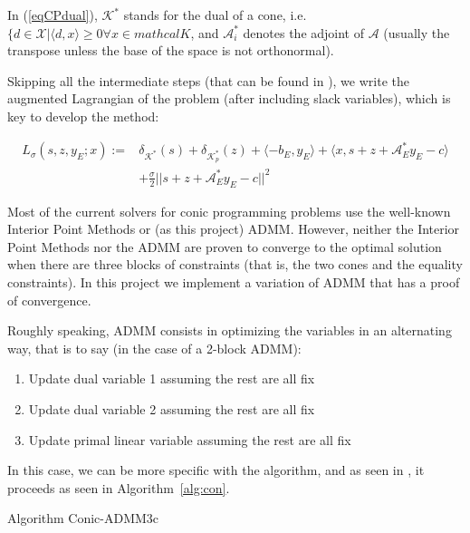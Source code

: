 \documentclass[paper=a4, fontsize=11pt]{scrartcl}
\numberwithin{equation}{section}		%
\numberwithin{figure}{section}			%
\numberwithin{table}{section}				%
\begin{document}
In (\ref{eqCPdual}), $\mathcal{K}^*$ stands for the dual of a cone, i.e. $\{d \in \mathcal{X} | \langle d,x \rangle \geq 0 \forall x \in mathcal{K}$, and $\mathcal{A}_i^*$ denotes the adjoint of $\mathcal{A}$ (usually the transpose unless the base of the space is not orthonormal). 

Skipping all the intermediate steps (that can be found in \cite{sun2014}), we write the augmented Lagrangian of the problem (after including slack variables), which is key to develop the method:

\begin{align*}
L_{\sigma} (s,z,y_E;x) := & \delta_{\mathcal{K}^*}(s) + \delta_{\mathcal{K}_p^*}(z) + \langle -b_E,y_E \rangle  + \langle x,s+z+\mathcal{A}_E^* y_E - c\rangle \\
& + \frac{\sigma}{2}||s+z+\mathcal{A}_E^* y_E - c||^2 
\end{align*}

Most of the current solvers for conic programming problems use the well-known Interior Point Methods or (as this project) ADMM. However, neither the Interior Point Methods nor the ADMM are proven to converge to the optimal solution when there are three blocks of constraints (that is, the two cones and the equality constraints). In this project we implement a variation of ADMM that has a proof of convergence.

Roughly speaking, ADMM consists in optimizing the variables in an alternating way, that is to say (in the case of a 2-block ADMM):
\begin{enumerate}
\item Update dual variable 1 assuming the rest are all fix
\item Update dual variable 2 assuming the rest are all fix
\item Update primal linear variable assuming the rest are all fix
\end{enumerate}
 
In this case, we can be more specific with the algorithm, and as seen in \cite{sun2014}, it proceeds as seen in Algorithm~\ref{alg:con}.
\begin{algorithm}
\label{alg:con}
	\caption{Algorithm Conic-ADMM3c}
\end{algorithm}
\end{document}
